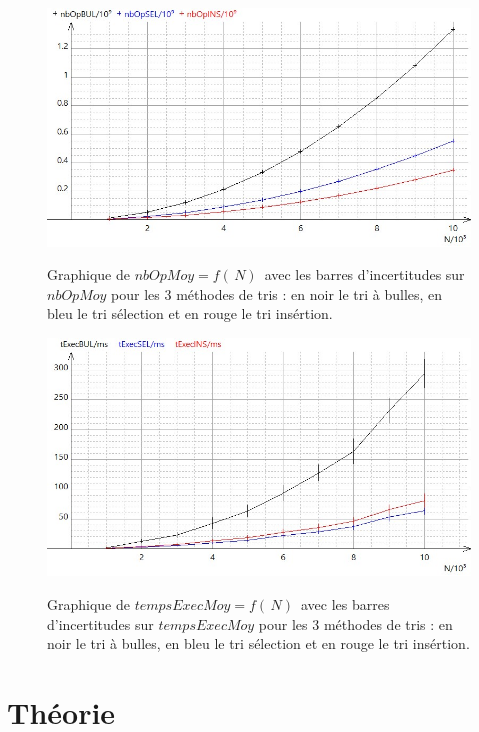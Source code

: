 \documentclass{report}
\begin{document}
\begin{figure}[H]
	\includegraphics[width=\textwidth]{../graphe/nbOP10a10k.jpg}
	\label{nbOP1k}
	\caption{Graphique de $nbOpMoy=f(\,N)\,$ avec les barres d'incertitudes sur $nbOpMoy$ pour les 3 méthodes de tris : en noir le tri à bulles, en bleu le tri sélection et en rouge le tri insértion.}
\end{figure}
\begin{figure}[H]
	\includegraphics[width=\textwidth]{../graphe/tExec10a10k.jpg}
	\label{tExec1k}
	\caption{Graphique de $tempsExecMoy=f(\,N)\,$ avec les barres d'incertitudes sur $tempsExecMoy$ pour les 3 méthodes de tris : en noir le tri à bulles, en bleu le tri sélection et en rouge le tri insértion.}
\end{figure}






\newpage
\chapter{Théorie}
\end{document}
